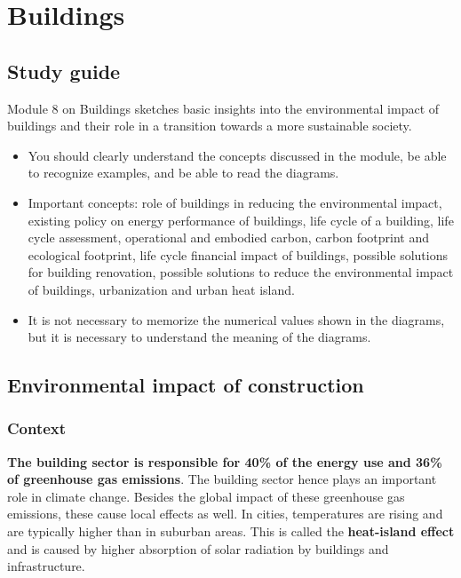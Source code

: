 \documentclass[../summary.tex]{subfiles}
\begin{document}
	
	\section{Buildings}
	
	\subsection{Study guide}
	
	Module 8 on Buildings sketches basic insights into the environmental impact of buildings and their role in a transition towards a more sustainable society. 
	
	\begin{itemize}
		\item You should clearly understand the concepts discussed in the module, be able to recognize examples, and be able to read the diagrams.
		\item Important concepts: role of buildings in reducing the environmental impact, existing policy on energy performance of buildings, life cycle of a building, life cycle assessment, operational and embodied carbon, carbon footprint and ecological footprint, life cycle financial impact of buildings, possible solutions for building renovation, possible solutions to reduce the environmental impact of buildings, urbanization and urban heat island.
		\item It is not necessary to memorize the numerical values shown in the diagrams, but it is necessary to understand the meaning of the diagrams.
	\end{itemize}
	
	\subsection{Environmental impact of construction}
	\subsubsection{Context}
	
	\textbf{The building sector is responsible for 40\% of the energy use and 36\% of greenhouse gas emissions}. The building sector hence plays an important role in climate change. Besides the global impact of these greenhouse gas emissions, these cause local effects as well. In cities, temperatures are rising and are typically higher than in suburban areas. This is called the \textbf{heat-island effect} and is caused by higher absorption of solar radiation by buildings and infrastructure.
	
\end{document}
